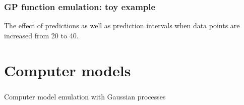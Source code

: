 \documentclass{beamer}
\begin{document}
\begin{frame}
  \frametitle{GP function emulation: toy example }
\begin{figure}
 \end{figure}
The effect of predictions as well as prediction intervals when data
points are increased from 20 to 40.
\end{frame}




\section{Computer models}


\begin{frame}
\frametitle{ }
\begin{center}
{\LARGE Computer model emulation with Gaussian processes}
\end{center}
\end{frame}




\end{document}
